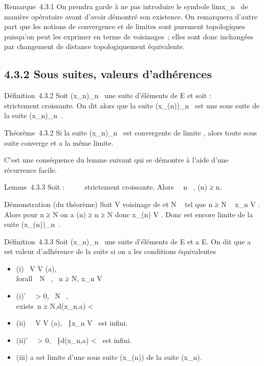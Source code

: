 \documentclass[]{article}
\begin{document}
Remarque~4.3.1 On prendra garde à ne pas introduire le symbole
limx_n~ de manière opératoire avant
d'avoir démontré son existence. On remarquera d'autre part que les
notions de convergence et de limites sont purement topologiques
puisqu'on peut les exprimer en terme de voisinages~; elles sont donc
inchangées par changement de distance topologiquement équivalente.

\subsection{4.3.2 Sous suites, valeurs d'adhérences}

Définition~4.3.2 Soit (x_n)_n\in{}~ une suite d'éléments
de E et soit \phi : ~ \rightarrow~ ~ strictement croissante. On dit alors que la suite
(x_\phi(n))_n\in{}~ est une sous suite de la suite
(x_n)_n\in{}~.

Théorème~4.3.2 Si la suite (x_n)_n\in{}~ est convergente
de limite \ell, alors toute sous suite converge et a la même limite.

C'est une conséquence du lemme suivant qui se démontre à l'aide d'une
récurrence facile.

Lemme~4.3.3 Soit \phi : ~ \rightarrow~ ~ strictement croissante. Alors
\forall~~n \in {}~, \phi(n) ≥ n.

Démonstration (du théorème) Soit V voisinage de \ell et N \in {}~ tel que n ≥ N
\rigtharrow~ x_n \in V . Alors pour n ≥ N on a \phi(n) ≥ n ≥ N donc
x_\phi(n) \in V . Donc \ell est encore limite de la suite
(x_\phi(n))_n\in{}~.

Définition~4.3.3 Soit (x_n)_n\in{}~ une suite d'éléments
de E et a \in E. On dit que a est valeur d'adhérence de la suite si on a
les conditions équivalentes

\begin{itemize}
\itemsep1pt\parskip0pt
\item
  (i) \forall~V \in V (a), \\forall~~N
  \in {}~, \exists~n ≥ N,\quad
  x_n \in V
\item
  (i)' \forall~~\epsilon > 0,
  \forall~N \in {}~, \\exists~n ≥
  N,\quad d(x_n,a) < \epsilon
\item
  (ii) \forall~~V \in V (a), \n \in
  ~∣x_n \in V \ est
  infini.
\item
  (ii)' \forall~~\epsilon > 0,
  \n \in {}~∣d(x_n,a)
  < \epsilon\ est infini.
\item
  (iii) a est limite d'une sous suite (x_\phi(n)) de la suite
  (x_n).
\end{itemize}
\end{document}
